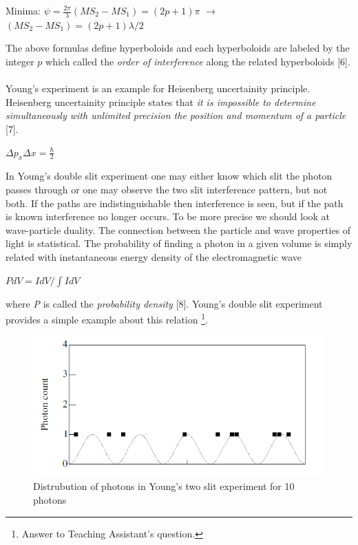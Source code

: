 \documentclass[a4paper,12pt]{report}
\begin{document}
\begin{center}
Minima: $\psi=\frac{2\pi}{\lambda}(MS_{2}-MS_{1})=(2p+1)\pi$ $\longrightarrow$ $(MS_{2}-MS_{1})=(2p+1)\lambda/2$
\end{center}
The above formulas define hyperboloids and each hyperboloids are labeled by the integer $p$ which called the \textit{order of interference} along the related hyperboloids [6].\\\\
Young's experiment is an example for Heisenberg uncertainity principle. Heisenberg uncertainity principle states that \textit{it is impossible to determine simultaneously
with unlimited precision the position and momentum of a particle} [7].
\begin{center}
	$\Delta p_{x} \Delta x=\frac{\hbar}{2}$
\end{center}
In Young’s double slit
experiment one may either know which slit the photon passes through
or one may observe the two slit interference pattern, but not both. If
the paths are indistinguishable then interference is seen, but if the path
is known interference no longer occurs. To be more precise we should look at wave-particle duality. The connection between the particle and wave properties of light is statistical. The probability of finding a photon in a given volume is simply related with instantaneous energy density of the electromagnetic wave
\begin{center}
	$PdV=IdV/\int IdV$
\end{center}
where \textit{P} is called the \textit{probability density} [8]. Young's double slit experiment provides a simple example about this relation \footnote{Answer to Teaching Assistant's question.}. 
\begin{figure}[h!]
\centering
\includegraphics[width=0.9\linewidth, height=0.26\textheight]{young2slit}
\caption{Distrubution of photons in Young's two slit experiment for 10 photons}
\label{fig:young2slit}
\end{figure}
\end{document}
